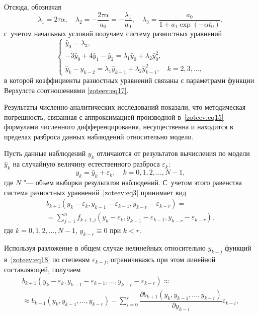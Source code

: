 Отсюда, обозначая 
\begin{equation}
\lambda_1=2\tau\alpha, \quad \lambda_2=-\dfrac{2\tau\alpha}{a_0}=-\dfrac{\lambda_1}{a_0}, \quad \lambda_3=\dfrac{a_0}{1+a_1\exp(-\alpha t_0)},
\label{zoteev:eq17}
\end{equation}
 с~учетом начальных условий получаем систему разностных уравнений
\begin{equation}
\left\{
\begin{array}{ll}
{\hat{y}_0=\lambda_3,} & \\
{-3\hat{y}_0+4\hat{y}_1-\hat{y}_2=\lambda_1\hat{y}_0+\lambda_2\hat{y}_0^2,} & \\
\hat{y}_k-\hat{y}_{k-2}=\lambda_1\hat{y}_{k-1}+\lambda_2\hat{y}_{k-1}^2, & k=2,3,\dots,
\label{zoteev:eq16}
\end{array}
\right.
\end{equation}
в которой коэффициенты разностных уравнений связаны с параметрами функции Верхулста соотношениями \eqref{zoteev:eq17}.



Результаты численно-аналитических исследований показали, что методическая погрешность, связанная с аппроксимацией производной в~\eqref{zoteev:eq15} формулами численного дифференцирования, несущественна и находится в пределах разброса данных наблюдений относительно модели. 


\smallskip

Пусть данные наблюдений $y_k$ отличаются от результатов вычисления по модели $\hat{y}_k$ на случайную величину естественного разброса $\varepsilon_k$: 
$$y_k=\hat{y}_k+\varepsilon_k,\quad  k=0,1,2,\dots,N-1,$$ 
где $N$ "--- объем выборки результатов наблюдений. 
С~учетом этого равенства система разностных уравнений~\eqref{zoteev:eq3} принимает вид
\begin{multline}
b_{k+1}(y_k-\varepsilon_k,y_{k-1}-\varepsilon_{k-1},y_{k-r}-\varepsilon_{k-r}) =
\\ 
=\sum_{j=1}^n f_{k+1,j}(y_k-\varepsilon_k,y_{k-1}-\varepsilon_{k-1},y_{k-r}-\varepsilon_{k-r}),
\label{zoteev:eq18}
\end{multline}
где  $k=0,1,2,\dots,N-1$, $y_{k-r}\equiv 0$ при $k<r$.

Используя разложение в общем случае нелинейных относительно $y_{k-j}$ функций в~\eqref{zoteev:eq18} по степеням $\varepsilon_{k-j}$, ограничиваясь при этом линейной составляющей, получаем
\begin{multline*}
b_{k+1}(y_k-\varepsilon_k,y_{k-1}-\varepsilon_{k-1},\dots, y_{k-r}-\varepsilon_{k-r})\approx \\
\approx b_{k+1}(y_k,y_{k-1},\dots,y_{k-r})-\sum_{i=0}^{r}\dfrac{\partial b_{k+1}(y_k,y_{k-1},\dots,y_{k-r})}{\partial y_{k-i}}\varepsilon_{k-i},
\end{multline*}

